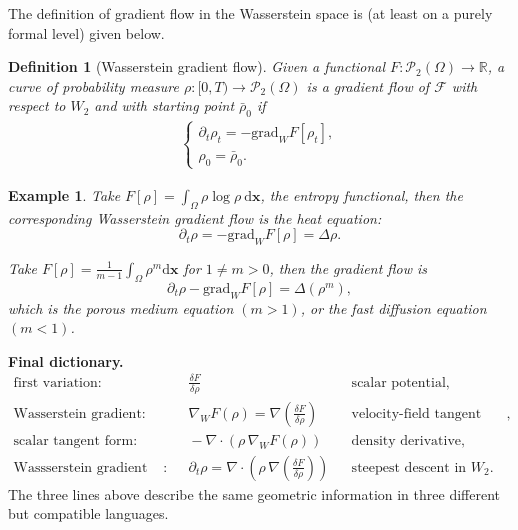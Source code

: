 \documentclass[11pt]{book}
\newtheorem{definition}[theorem]{Definition}
\newtheorem{example}[theorem]{Example}
\newcommand{\dx}{\mathrm{d}\mathbf{x}}
\newcommand{\gradw}{\nabla_{\!W}}
\newcommand{\deldrho}[1]{\frac{\delta #1}{\delta\rho}}
\begin{document}
The definition of gradient flow in the Wasserstein space is (at least on a purely formal level) given below.

\begin{definition} [Wasserstein gradient flow] Given a functional \( F : \mathcal{P}_2(\Omega) \to \mathbb{R} \), 
a curve of probability measure \( \rho : [0, T) \to \mathcal{P}_2(\Omega) \) is a  gradient flow of \( \mathcal{F} \) 
with respect to \( W_2 \) and with starting point \( \bar{\rho}_0 \) if
\begin{align}\label{eqn:Wasserstein_gradientflow}
    \begin{cases}
        \partial_t \rho_t = -\mathrm{grad}_{W} F[\rho_t], \\
        \rho_0 = \bar{\rho}_0.
    \end{cases}
\end{align}
\end{definition}

\begin{example}
    Take $F[\rho] = \int_{\Omega} \rho \log \rho \ \dx$, the entropy functional, then the corresponding Wasserstein gradient flow is the heat equation:
    \[
    \partial_t \rho = -\mathrm{grad}_W F[\rho] = \Delta \rho.
    \]

    Take $F[\rho] = \frac{1}{m-1}\int_{\Omega}\rho^m \dx$ for $1\ne m >0$, then the gradient flow is
    \[
    \partial_t \rho -\mathrm{grad}_W F[\rho] = \Delta (\rho^m),
    \]
    which is the porous medium equation $(m>1)$, or the fast diffusion equation $(m<1)$.
    
\end{example}



\begin{summarybox}
\textbf{Final dictionary.}
\begin{align*}
\text{first variation}: &\quad \deldrho{F} && \text{scalar potential},\\[0.3em]
\text{Wasserstein gradient}: &\quad \gradw F(\rho)=\nabla\!\left(\deldrho{F}\right) && \text{velocity-field tangent vector},\\[0.3em]
\text{scalar tangent form}: &\quad -\nabla\cdot\!\left(\rho\,\gradw F(\rho)\right) && \text{density derivative},\\[0.3em]
\text{Wassserstein gradient flow}: &\quad \partial_t\rho = \nabla\cdot\!\left(\rho\,\nabla\!\left(\deldrho{F}\right)\right) && \text{steepest descent in } W_2.
\end{align*}
The three lines above describe the same geometric information in three different but compatible languages.
\end{summarybox}
\end{document}
